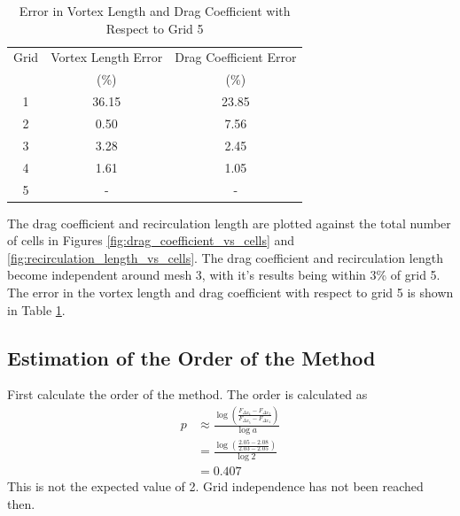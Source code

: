 \begin{table}[H]
    \centering
    \caption{Error in Vortex Length and Drag Coefficient with Respect to Grid 5}
    \label{tab:error_vortex_length_drag_coefficient}
    \begin{tabular}{ccc}
        \toprule
        Grid & Vortex Length Error & Drag Coefficient Error \\
        & (\%) & (\%) \\
        \midrule
        1 & 36.15 & 23.85 \\
        2 & 0.50 & 7.56 \\
        3 & 3.28 & 2.45 \\
        4 & 1.61 & 1.05 \\
        5 & - & - \\
        \bottomrule
    \end{tabular}
\end{table}
The drag coefficient and recirculation length are plotted against the total number of cells in Figures \ref{fig:drag_coefficient_vs_cells} and \ref{fig:recirculation_length_vs_cells}. The drag coefficient and recirculation length become independent around mesh 3, with it's results being within 3\% of grid 5. The error in the vortex length and drag coefficient with respect to grid 5 is shown in Table \ref{tab:error_vortex_length_drag_coefficient}.

\subsection{Estimation of the Order of the Method}
First calculate the order of the method. The order is calculated as
\begin{align*}
    p &\approx \frac{\log\left(\frac{F_{\Delta x_4} - F_{\Delta x_3}}{F_{\Delta x_5} - F_{\Delta x_4}}\right)}{\log a } \\
    &= \frac{\log\left(\frac{2.05 - 2.08}{2.03 - 2.05}\right)}{\log 2} \\
    &= \boxed{0.407}
\end{align*}
This is not the expected value of 2. Grid independence has not been reached then.

